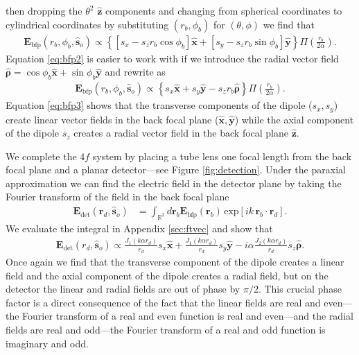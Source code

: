 \documentclass[]{osa-article}
\providecommand{\mb}[1]{\mathbf{#1}}
\providecommand{\so}{\mathbf{\hat{s}}_o}
\providecommand{\rb}{\mathbf{r}_b}
\providecommand{\rd}{\mathbf{r}_d}
\providecommand{\mh}[1]{\mathbf{\hat{#1}}}
\providecommand{\mbb}[1]{\mathbb{#1}}
\providecommand{\bs}[1]{\boldsymbol{#1}}
\begin{document}
then dropping the $\theta^2$ $\mh{z}$ components and changing from spherical
coordinates to cylindrical coordinates by substituting $(r_b, \phi_b)$ for
$(\theta, \phi)$ we find that
\begin{align}
  \mb{E}_{\text{bfp}}(r_b, \phi_b, \so{}) \propto \left\{\left[s_x - s_zr_b\cos\phi_b\right]\mh{x} + \left[s_y - s_z r_b\sin\phi_b\right]\mh{y}\right\}\Pi\left(\frac{r_b}{2\alpha}\right). \label{eq:bfp2}
\end{align}
Equation \ref{eq:bfp2} is easier to work with if we introduce the radial vector
field $\mh{\bs{\rho}} = \cos\phi_b\mh{x} + \sin\phi_b\mh{y}$ and rewrite as
\begin{align}
  \mb{E}_{\text{bfp}}(r_b, \phi_b, \so{}) \propto \left\{s_x\mh{x} + s_y\mh{y} - s_z r_b \mh{\bs{\rho}}\right\}\Pi\left(\frac{r_b}{2\alpha}\right). \label{eq:bfp3}
\end{align}
Equation \ref{eq:bfp3} shows that the transverse components of the dipole
($s_x, s_y$) create linear vector fields in the back focal plane
($\mh{x}, \mh{y}$) while the axial component of the dipole $s_z$ creates a radial
vector field in the back focal plane $\mh{z}$. 

We complete the 4$f$ system by placing a tube lens one focal length from the
back focal plane and a planar detector---see Figure \ref{fig:detection}. Under
the paraxial approximation we can find the electric field in the detector plane
by taking the Fourier transform of the field in the back focal plane
\cite{goodman1996}
\begin{align}
  \mb{E}_{\text{det}}(\rd{}, \so{}) &= \int_{\mbb{R}^2}d\rb{} \mb{E}_{\text{bfp}}(\rb{})\, \text{exp}\left[ik\,\rb{}\cdot\rd{}\right].\label{eq:det1}
\end{align}
We evaluate the integral in Appendix \ref{sec:ftvec} and show that 
\begin{align}
  \mb{E}_{\text{det}}(r_d, \so{}) \propto \frac{J_1(k\alpha r_d)}{r_d}s_x\mh{x} + \frac{J_1(k\alpha r_d)}{r_d}s_y\mh{y} - i\alpha\frac{J_2(k\alpha r_d)}{r_d}s_z\mh{\bs{\rho}}.
\end{align}
Once again we find that the transverse component of the dipole creates a linear
field and the axial component of the dipole creates a radial field, but on the
detector the linear and radial fields are out of phase by $\pi/2$. This crucial
phase factor is a direct consequence of the fact that the linear fields are real
and even---the Fourier transform of a real and even function is real and
even---and the radial fields are real and odd---the Fourier transform of a real
and odd function is imaginary and odd.
\end{document}
